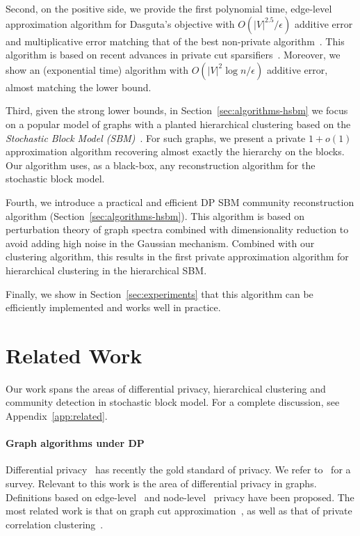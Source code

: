 Second, on the positive side, we provide the first polynomial time, edge-level approximation algorithm for Dasguta's objective with $ O(|V|^{2.5} /\epsilon)$ additive error and multiplicative error matching that of the best non-private algorithm~\citep{agarwal2022sublinear}. This algorithm is based on recent advances in private cut sparsifiers~\citep{eliavs2020differentially}. Moreover, we show an (exponential time) algorithm with $O(|V|^{2} \log n/ \epsilon)$ additive error, almost matching the lower bound.

Third, given the strong lower bounds, in Section~\ref{sec:algorithms-hsbm} we focus on a popular model of graphs with a planted hierarchical clustering based on the {\em Stochastic Block Model (SBM)}~\citep{cohen2017hierarchical}. For such graphs, we present a private $1+o(1)$ approximation algorithm recovering almost exactly the hierarchy on the blocks. Our algorithm uses, as a black-box, any reconstruction algorithm for the stochastic block model. 

Fourth, we introduce a practical and efficient DP SBM community reconstruction algorithm (Section~\ref{sec:algorithms-hsbm}). This algorithm is based on perturbation theory of graph spectra combined with dimensionality reduction to avoid adding high noise in the Gaussian mechanism. Combined with our clustering algorithm, this results in the first private approximation algorithm for hierarchical clustering in the hierarchical SBM. 

Finally, we show in Section~\ref{sec:experiments} that this algorithm can be efficiently implemented and works well in practice.

\section{Related Work}
\label{sec:related}

Our work spans the areas of differential privacy, hierarchical clustering and community detection in stochastic block model. For a complete discussion, see Appendix~\ref{app:related}.

\paragraph{Graph algorithms under DP}
Differential privacy~\citep{dwork2006calibrating} has recently the gold standard of privacy. We refer to~\citet{dwork2014algorithmic} for a survey. Relevant to this work is the area of differential privacy in graphs. Definitions based on edge-level~\citep{epasto2022differentially,eliavs2020differentially} and node-level~\citep{kasiviswanathan2013analyzing} privacy have been proposed. The most related work is that on graph cut approximation~\citep{eliavs2020differentially,arora2019differentially}, as well as that of private correlation clustering~\citep{bun2021differentially, cohen2022near}.

